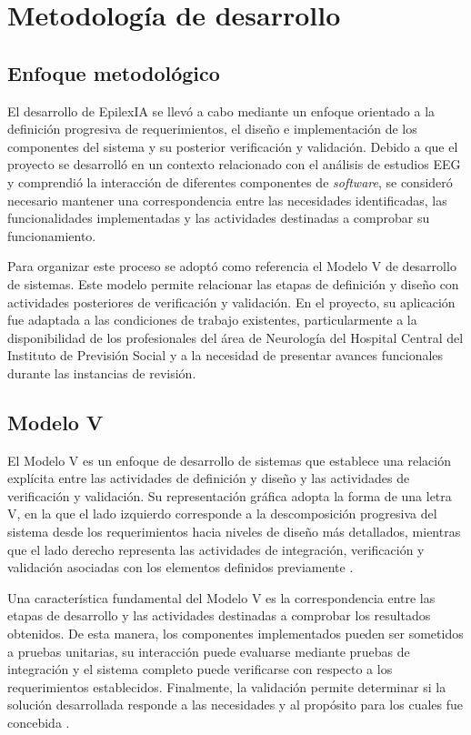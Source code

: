 \chapter{Metodología de desarrollo}
\label{cap:metodologia}

\section{Enfoque metodológico}
\label{sec:enfoque-metodologico}

El desarrollo de EpilexIA se llevó a cabo mediante un enfoque orientado a la
definición progresiva de requerimientos, el diseño e implementación de los
componentes del sistema y su posterior verificación y validación. Debido a que el proyecto se desarrolló en un contexto relacionado con el análisis de estudios EEG y comprendió la interacción de
diferentes componentes de \textit{software}, se consideró necesario mantener una correspondencia entre las necesidades identificadas, las funcionalidades implementadas y las actividades destinadas
a comprobar su funcionamiento.

Para organizar este proceso se adoptó como referencia el Modelo V de desarrollo
de sistemas. Este modelo permite relacionar las etapas de definición y diseño
con actividades posteriores de verificación y validación. En el proyecto, su
aplicación fue adaptada a las condiciones de trabajo existentes, particularmente
a la disponibilidad de los profesionales del área de Neurología del Hospital
Central del Instituto de Previsión Social y a la necesidad de presentar avances
funcionales durante las instancias de revisión.

\section{Modelo V}
\label{sec:modelo-v}

El Modelo V es un enfoque de desarrollo de sistemas que establece una relación
explícita entre las actividades de definición y diseño y las actividades de
verificación y validación. Su representación gráfica adopta la forma de una
letra V, en la que el lado izquierdo corresponde a la descomposición progresiva
del sistema desde los requerimientos hacia niveles de diseño más detallados,
mientras que el lado derecho representa las actividades de integración,
verificación y validación asociadas con los elementos definidos previamente
\citep{ForsbergMooz1991}.

Una característica fundamental del Modelo V es la correspondencia entre las
etapas de desarrollo y las actividades destinadas a comprobar los resultados
obtenidos. De esta manera, los componentes implementados pueden ser sometidos
a pruebas unitarias, su interacción puede evaluarse mediante pruebas de
integración y el sistema completo puede verificarse con respecto a los
requerimientos establecidos. Finalmente, la validación permite determinar si
la solución desarrollada responde a las necesidades y al propósito para los
cuales fue concebida \citep{ForsbergMooz1991}.


